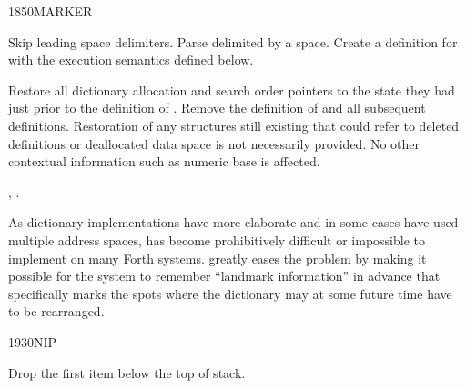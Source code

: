 \begin{worddef}{1850}{MARKER}
\item {}

	Skip leading space delimiters. Parse  delimited by
	a space. Create a definition for  with the execution
	semantics defined below.

\execute[name]
	\stack{}{}

	Restore all dictionary allocation and search order pointers to
	the state they had just prior to the definition of .
	Remove the definition of  and all subsequent
	definitions. Restoration of any structures still existing that
	could refer to deleted definitions or deallocated data space is
	not necessarily provided. No other contextual information such
	as numeric base is affected.

\see {},
	.

	\begin{defer}
	\rationale %
		As dictionary implementations have  more elaborate
		and in some cases have used multiple address spaces,
		 has become prohibitively difficult or
		impossible to implement on many Forth systems. 
		greatly eases the problem by making it possible for the
		system to remember ``landmark information'' in advance that
		specifically marks the spots where the dictionary may at some
		future time have to be rearranged.
	\end{defer}
\end{worddef}


\begin{worddef}{1930}{NIP}
\item {}

	Drop the first item below the top of stack.
\end{worddef}


